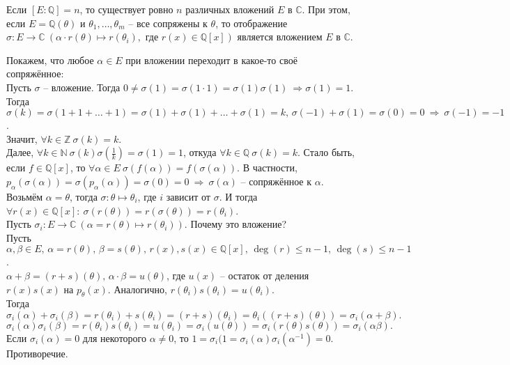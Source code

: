 \begin{theorem} \label{l12_th6}
	Если $[E \colon \mathbb{Q}] = n$, то существует ровно $n$ различных вложений $E$ в $\mathbb{C}$. 
	При этом, если $E = \mathbb{Q}(\theta)$ и $\theta_1, \dots, \theta_m$ -- все сопряжены к $\theta$, то отображение $\sigma \colon E \to \mathbb{C} \ (\alpha \cdot r(\theta) \mapsto r(\theta_i), \text{ где } r(x)\in\mathbb{Q}[x])$ является вложением $E$ в $\mathbb{C}$.
\end{theorem}
\begin{pf}
	Покажем, что любое $\alpha \in E$ при вложении переходит в какое-то своё сопряжённое:\\
	Пусть $\sigma$ -- вложение. Тогда $0 \ne \sigma(1) = \sigma(1 \cdot 1) = \sigma(1)\sigma(1) \ \Rightarrow \sigma(1)=1$.\\
	Тогда $\sigma(k) = \sigma(1+1+\dots+1) = \sigma(1)+\sigma(1)+\dots+\sigma(1) = k, \, \sigma(-1)+\sigma(1)=\sigma(0)=0 \ \Rightarrow \ \sigma(-1)=-1$.\\
	Значит, $\forall k \in \mathbb{Z} \ \sigma(k)=k$.\\
	Далее, $\forall k \in \mathbb{N} \ \sigma(k)\sigma\left(\frac{1}{k}\right) = \sigma(1) = 1$, откуда $\forall k \in \mathbb{Q} \ \sigma(k)=k$. Стало быть, если $f \in \mathbb{Q}[x]$, то $\forall \alpha \in E \ \sigma(f(\alpha)) = f(\sigma(\alpha))$. В частности, $p_\alpha(\sigma(\alpha)) = \sigma(p_\alpha(\alpha)) = \sigma(0) = 0 \ \Rightarrow \ \sigma(\alpha)$ -- сопряжённое к $\alpha$.\\
	Возьмём $\alpha = \theta$, тогда $\sigma \colon \theta \mapsto \theta_i$, где $i$ зависит от $\sigma$. И тогда $\forall r(x) \in \mathbb{Q}[x]: \ \sigma(r(\theta)) = r(\sigma(\theta)) = r(\theta_i)$.\\
	Пусть $\sigma_i\colon E \to \mathbb{C} \ (\alpha = r(\theta) \mapsto r(\theta_i))$. Почему это вложение?\\
	Пусть $\alpha, \beta \in E, \, \alpha = r(\theta), \, \beta = s(\theta), \, r(x), s(x) \in \mathbb{Q}[x], \, \deg(r) \leq n-1, \, \deg(s) \leq n-1$.\\
	$\alpha + \beta = (r+s)(\theta), \, \alpha \cdot \beta = u(\theta)$, где $u(x)$ -- остаток от деления $r(x)s(x)$ на $p_\theta(x)$. Аналогично, $r(\theta_i)s(\theta_i) = u(\theta_i)$.\\
	Тогда
	$$\sigma_i(\alpha)+\sigma_i(\beta) = r(\theta_i)+s(\theta_i) = (r+s)(\theta_i) = \theta_i((r+s)(\theta)) = \sigma_i(\alpha+\beta).$$
	$$\sigma_i(\alpha)\sigma_i(\beta) = r(\theta_i)s(\theta_i) = u(\theta_i) = \sigma_i(u(\theta)) = \sigma_i(r(\theta)s(\theta)) = \sigma_i(\alpha\beta).$$
	Если $\sigma_i(\alpha) = 0$ для некоторого $\alpha \ne 0$, то $1=\sigma_i(1 =\sigma_i(\alpha)\sigma_i(\alpha^{-1})=0$.
	Противоречие.
\end{pf}

